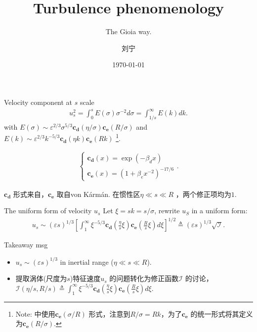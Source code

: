 \documentclass[10pt,xcolor={table,dvipsnames},t]{beamer}
\title{Turbulence phenomenology}
\subtitle{The Gioia way.}
\author{刘宁}
\institute{浙江大学}
\date{\today}
\begin{document}
\begin{frame}
  \titlepage
\end{frame}

\begin{frame}{Velocity component at $s$ scale}
    \begin{align*}
        u_s^2 = \int_0^s E(\sigma) \sigma^{-2} d\sigma = \int_{1 / s}^{\infty} E(k) dk
    .\end{align*}
    with $E(\sigma) \sim \varepsilon^{2 / 3} \sigma^{5 / 3} \mathbf{c_d} \left( \eta / \sigma \right) \mathbf{c_e} \left( R / \sigma \right)$ and $E(k) \sim \varepsilon^{2 / 3} k^{-5 / 3} \mathbf{c_d} (\eta k) \mathbf{c_e} \left( Rk \right) $ \footnote{Note: \citet{gioiaFriction2006}中使用$\mathbf{c_e} \left( \sigma / R \right) $ 形式，注意到$R / \sigma = Rk$，为了$\mathbf{c_e} $ 的统一形式将其定义为$\mathbf{c_e} \left( R / \sigma \right) $.}.

    \begin{align*}
        \begin{cases}
            \mathbf{c_d}\left( x \right)  = \exp\left( -\beta_d x \right) \\
            \mathbf{c_e} \left( x \right) = \left( 1+\beta_e x^{-2} \right) ^{-17 / 6} 
        \end{cases}
    .\end{align*}

    $\mathbf{c_d}$ 形式来自\citet{gioiaFriction2006}，$\mathbf{c_e}$ 取自von K\'arm\'an. 在惯性区$\eta \ll s \ll R$ ，两个修正项均为$1$.
    
\end{frame}

\begin{frame}{The uniform form of velocity $u_s$}
    Let $\xi = sk = s / \sigma$, rewrite $u_S$ in a uniform form:
    \begin{align*}
        u_s \sim \left( \varepsilon s \right) ^{1 / 3} \left[ \int_1^{\infty} \xi^{-5 / 3} \mathbf{c_d}\left( \frac{\eta}{s} \xi \right) \mathbf{c_e} \left( \frac{R}{s} \xi \right) d\xi \right]^{1 / 2}  \triangleq \left( \varepsilon s \right) ^{1 / 3} \sqrt{\mathcal{I} } 
    .\end{align*}
    \begin{block}{Takeaway msg}
        \begin{itemize}
            \item $u_s \sim \left( \varepsilon s \right) ^{1 / 3} $ in inertial range ($\eta \ll s \ll R$).
            \item 提取涡体(尺度为$s$)特征速度$u_s$ 的问题转化为修正函数$\mathcal{I}$ 的讨论，$\mathcal{I}\left( \eta / s, R / s \right)  \triangleq \int_1^{\infty} \xi^{-5 / 3} \mathbf{c_d}\left( \frac{\eta}{s} \xi \right) \mathbf{c_e} \left( \frac{R}{s} \xi \right) d\xi$.
        \end{itemize}
    \end{block}
\end{frame}
\end{document}
